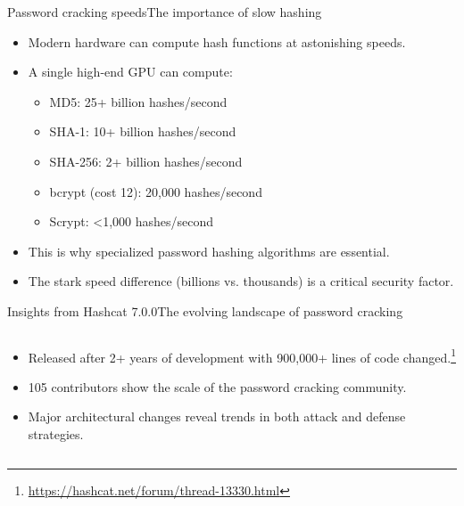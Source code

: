 \documentclass[aspectratio=169, lualatex, handout]{beamer}
\begin{document}
\begin{frame}{Password cracking speeds}{The importance of slow hashing}
	\begin{itemize}[<+->]
		\item Modern hardware can compute hash functions at astonishing speeds.
		\item A single high-end GPU can compute:
		      \begin{itemize}
			      \item MD5: 25+ billion hashes/second
			      \item SHA-1: 10+ billion hashes/second
			      \item SHA-256: 2+ billion hashes/second
			      \item bcrypt (cost 12): 20,000 hashes/second
			      \item Scrypt: <1,000 hashes/second
		      \end{itemize}
		\item This is why specialized password hashing algorithms are essential.
		\item The stark speed difference (billions vs. thousands) is a critical security factor.
	\end{itemize}
\end{frame}

\begin{frame}{Insights from Hashcat 7.0.0}{The evolving landscape of password cracking}
	\begin{columns}[c]
		\begin{column}{1\textwidth}
			\begin{itemize}[<+->]
				\item Released after 2+ years of development with 900,000+ lines of code changed.\footnote{\url{https://hashcat.net/forum/thread-13330.html}}
				\item 105 contributors show the scale of the password cracking community.
				\item Major architectural changes reveal trends in both attack and defense strategies.
			\end{itemize}
		\end{column}
	\end{columns}
\end{frame}
\end{document}
